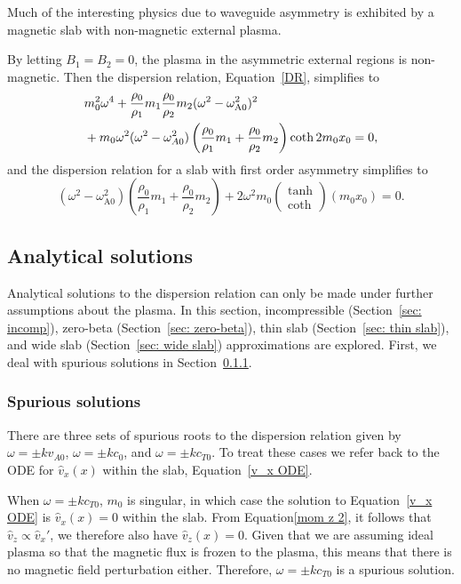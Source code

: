 Much of the interesting physics due to waveguide asymmetry is exhibited by a magnetic slab with non-magnetic external plasma.

By letting $B_1 = B_2 = 0$, the plasma in the asymmetric external regions is non-magnetic. Then the dispersion relation, Equation~\eqref{DR}, simplifies to
\begin{align}
&m_0^2\omega^4 + \frac{\rho_0}{\rho_1}m_1\frac{\rho_0}{\rho_2}m_2(\omega^2 - \omega_\textrm{A0}^2)^2 \notag \\
&+ m_0\omega^2(\omega^2 - \omega_{A0}^2)\left(\frac{\rho_0}{\rho_1}m_1 + \frac{\rho_0}{\rho_2}m_2\right)\coth{2m_0x_0} = 0, \label{DR non-mag}
\end{align}
and the dispersion relation for a slab with first order asymmetry simplifies to
\begin{equation}
(\omega^2 - \omega_\textrm{A0}^2)\left(\frac{\rho_0}{\rho_1}m_1 + \frac{\rho_0}{\rho_2}m_2\right)  +  2\omega^2m_0\left(\begin{matrix}\tanh \\ \coth \end{matrix}\right)(m_0x_0) = 0. \label{DR approx non-mag}
\end{equation}


\subsection{Analytical solutions} \label{sec: analytical solutions}
Analytical solutions to the dispersion relation can only be made under further assumptions about the plasma. In this section, incompressible (Section~\ref{sec: incomp}), zero-beta (Section~\ref{sec: zero-beta}), thin slab (Section~\ref{sec: thin slab}), and wide slab (Section~\ref{sec: wide slab}) approximations are explored. First, we deal with spurious solutions in Section~\ref{sec: spurious}.

\subsubsection{Spurious solutions} \label{sec: spurious}
There are three sets of spurious roots to the dispersion relation given by $\omega = \pm kv_{A0}$, $\omega = \pm kc_0$, and $\omega = \pm kc_{T0}$. To treat these cases we refer back to the ODE for $\widehat{v}_x(x)$ within the slab, Equation~\eqref{v_x ODE}.

When $\omega = \pm kc_{T0}$, $m_0$ is singular, in which case the solution to Equation~\eqref{v_x ODE} is $\widehat{v}_x(x) = 0$ within the slab. From Equation\eqref{mom z 2}, it follows that $\widehat{v}_z \propto \widehat{v}_x'$, we therefore also have $\widehat{v}_z(x) = 0$. Given that we are assuming ideal plasma so that the magnetic flux is frozen to the plasma, this means that there is no magnetic field perturbation either. Therefore, $\omega = \pm kc_{T0}$ is a spurious solution.

